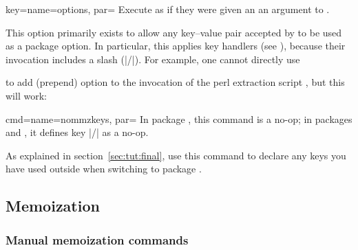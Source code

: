 \documentclass[a4paper,11pt]{article}
\begin{document}
\begin{doc}{key={name=options, par=}}
  Execute  as if they were given an an argument to .

  This option primarily exists to allow any key--value pair accepted by
   to be used as a package option.  In particular, this applies
  key handlers (see ), because their invocation includes a slash
  (|/|).  For example, one cannot directly use
  \begin{center}
  \end{center}
  to add (prepend) option  to the
  invocation of the perl extraction script , but
  this will work:
  \begin{center}
  \end{center}
\end{doc}

\begin{doc}{cmd={name=nommzkeys, par=}}
  In package , this command is a no-op; in packages
   and , it defines key
  |/| as a no-op.

  As explained in section~\ref{sec:tut:final}, use this command to declare any
   keys you have used outside  when switching
  to package .
\end{doc}


\subsection{Memoization}
\label{sec:ref:memoization}

\subsubsection{Manual memoization commands}
\label{sec:ref:memoization:manual}
\end{document}
